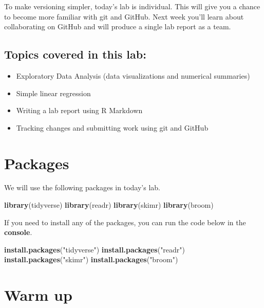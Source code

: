 \documentclass[]{book}
\newenvironment{Shaded}{\begin{snugshade}}{\end{snugshade}}
\newcommand{\KeywordTok}[1]{\textcolor[rgb]{0.13,0.29,0.53}{\textbf{#1}}}
\newcommand{\StringTok}[1]{\textcolor[rgb]{0.31,0.60,0.02}{#1}}
\newcommand{\NormalTok}[1]{#1}
\providecommand{\tightlist}{%
  \setlength{\itemsep}{0pt}\setlength{\parskip}{0pt}}
\begin{document}
To make versioning simpler, today's lab is individual. This will give
you a chance to become more familiar with git and GitHub. Next week
you'll learn about collaborating on GitHub and will produce a single lab
report as a team.

\subsection{Topics covered in this
lab:}\label{topics-covered-in-this-lab}

\begin{itemize}
\tightlist
\item
  Exploratory Data Analysis (data visualizations and numerical
  summaries)
\item
  Simple linear regression
\item
  Writing a lab report using R Markdown
\item
  Tracking changes and submitting work using git and GitHub
\end{itemize}

\section{Packages}\label{packages}

We will use the following packages in today's lab.

\begin{Shaded}
\begin{Highlighting}[]
\KeywordTok{library}\NormalTok{(tidyverse)}
\KeywordTok{library}\NormalTok{(readr)}
\KeywordTok{library}\NormalTok{(skimr)}
\KeywordTok{library}\NormalTok{(broom)}
\end{Highlighting}
\end{Shaded}

If you need to install any of the packages, you can run the code below
in the \textbf{console}.

\begin{Shaded}
\begin{Highlighting}[]
\KeywordTok{install.packages}\NormalTok{(}\StringTok{"tidyverse"}\NormalTok{) }
\KeywordTok{install.packages}\NormalTok{(}\StringTok{"readr"}\NormalTok{)}
\KeywordTok{install.packages}\NormalTok{(}\StringTok{"skimr"}\NormalTok{)}
\KeywordTok{install.packages}\NormalTok{(}\StringTok{"broom"}\NormalTok{)}
\end{Highlighting}
\end{Shaded}

\section{Warm up}\label{warm-up}
\end{document}

